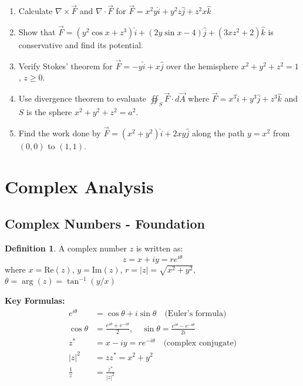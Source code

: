 \documentclass[12pt,a4paper]{article}
\theoremstyle{definition}
\newtheorem{definition}[theorem]{Definition}
\begin{document}
\begin{enumerate}
    \item Calculate $\nabla \times \vec{F}$ and $\nabla \cdot \vec{F}$ for $\vec{F} = x^2y\hat{i} + y^2z\hat{j} + z^2x\hat{k}$
    
    \item Show that $\vec{F} = (y^2\cos x + z^3)\hat{i} + (2y\sin x - 4)\hat{j} + (3xz^2 + 2)\hat{k}$ is conservative and find its potential.
    
    \item Verify Stokes' theorem for $\vec{F} = -y\hat{i} + x\hat{j}$ over the hemisphere $x^2 + y^2 + z^2 = 1$, $z \geq 0$.
    
    \item Use divergence theorem to evaluate $\oiint_S \vec{F} \cdot d\vec{A}$ where $\vec{F} = x^3\hat{i} + y^3\hat{j} + z^3\hat{k}$ and $S$ is the sphere $x^2 + y^2 + z^2 = a^2$.
    
    \item Find the work done by $\vec{F} = (x^2 + y^2)\hat{i} + 2xy\hat{j}$ along the path $y = x^2$ from $(0,0)$ to $(1,1)$.
\end{enumerate}

\newpage
\section{Complex Analysis}

\subsection{Complex Numbers - Foundation}

\begin{definition}
A complex number $z$ is written as:
\[
z = x + iy = r e^{i\theta}
\]
where $x = \text{Re}(z)$, $y = \text{Im}(z)$, $r = |z| = \sqrt{x^2 + y^2}$, $\theta = \arg(z) = \tan^{-1}(y/x)$
\end{definition}

\begin{importantbox}
\textbf{Key Formulas:}
\begin{align}
e^{i\theta} &= \cos\theta + i\sin\theta \quad \text{(Euler's formula)} \\
\cos\theta &= \frac{e^{i\theta} + e^{-i\theta}}{2}, \quad \sin\theta = \frac{e^{i\theta} - e^{-i\theta}}{2i} \\
z^* &= x - iy = re^{-i\theta} \quad \text{(complex conjugate)} \\
|z|^2 &= zz^* = x^2 + y^2 \\
\frac{1}{z} &= \frac{z^*}{|z|^2}
\end{align}
\end{importantbox}
\end{document}
